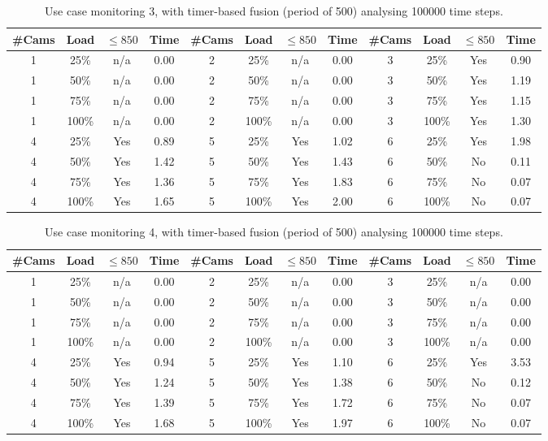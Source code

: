 \documentclass{article}
\begin{document}
\begin{table}
\centering
\begin{tabular}{|c|c|c|c|c|c|c|c|c|c|c|c|}
\hline
\#Cams & Load & $\leq 850$ & Time & \#Cams & Load & $\leq 850$ & Time & \#Cams & Load & $\leq 850$ & Time\\
\hline
1 & 25\% & n/a & 0.00 & 2 & 25\% & n/a & 0.00 & 3 & 25\% & Yes & 0.90\\
1 & 50\% & n/a & 0.00 & 2 & 50\% & n/a & 0.00 & 3 & 50\% & Yes & 1.19\\
1 & 75\% & n/a & 0.00 & 2 & 75\% & n/a & 0.00 & 3 & 75\% & Yes & 1.15\\
1 & 100\% & n/a & 0.00 & 2 & 100\% & n/a & 0.00 & 3 & 100\% & Yes & 1.30\\
\hline
4 & 25\% & Yes & 0.89 & 5 & 25\% & Yes & 1.02 & 6 & 25\% & Yes & 1.98\\
4 & 50\% & Yes & 1.42 & 5 & 50\% & Yes & 1.43 & 6 & 50\% & No & 0.11\\
4 & 75\% & Yes & 1.36 & 5 & 75\% & Yes & 1.83 & 6 & 75\% & No & 0.07\\
4 & 100\% & Yes & 1.65 & 5 & 100\% & Yes & 2.00 & 6 & 100\% & No & 0.07\\
\hline
\end{tabular}
\caption{Use case monitoring 3, with timer-based fusion (period of 500) analysing 100000 time steps.}
\end{table}


\begin{table}
\centering
\begin{tabular}{|c|c|c|c|c|c|c|c|c|c|c|c|}
\hline
\#Cams & Load & $\leq 850$ & Time & \#Cams & Load & $\leq 850$ & Time & \#Cams & Load & $\leq 850$ & Time\\
\hline
1 & 25\% & n/a & 0.00 & 2 & 25\% & n/a & 0.00 & 3 & 25\% & n/a & 0.00\\
1 & 50\% & n/a & 0.00 & 2 & 50\% & n/a & 0.00 & 3 & 50\% & n/a & 0.00\\
1 & 75\% & n/a & 0.00 & 2 & 75\% & n/a & 0.00 & 3 & 75\% & n/a & 0.00\\
1 & 100\% & n/a & 0.00 & 2 & 100\% & n/a & 0.00 & 3 & 100\% & n/a & 0.00\\
\hline
4 & 25\% & Yes & 0.94 & 5 & 25\% & Yes & 1.10 & 6 & 25\% & Yes & 3.53\\
4 & 50\% & Yes & 1.24 & 5 & 50\% & Yes & 1.38 & 6 & 50\% & No & 0.12\\
4 & 75\% & Yes & 1.39 & 5 & 75\% & Yes & 1.72 & 6 & 75\% & No & 0.07\\
4 & 100\% & Yes & 1.68 & 5 & 100\% & Yes & 1.97 & 6 & 100\% & No & 0.07\\
\hline
\end{tabular}
\caption{Use case monitoring 4, with timer-based fusion (period of 500) analysing 100000 time steps.}
\end{table}
\end{document}
